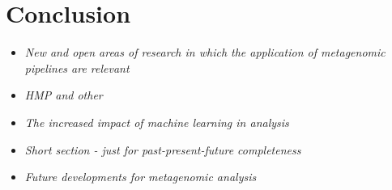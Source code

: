 \documentclass{article}
\begin{document}
\section{Conclusion}
\begin{itemize}
	\item \emph{New and open areas of research in which the application of metagenomic pipelines are relevant}
	\item \emph{HMP and other }
	\item \emph{The increased impact of machine learning in analysis}
	\item \emph{Short section - just for past-present-future completeness}
	\item \emph{Future developments for metagenomic analysis}
\end{itemize}

\end{document}
